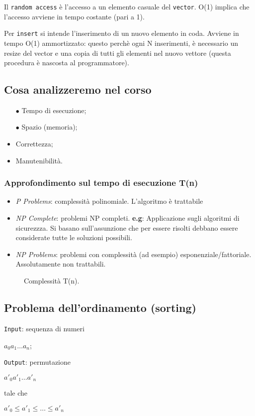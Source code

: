 Il \texttt{random access} è l'accesso a un elemento casuale del \texttt{vector}. 
O(1) implica che l'accesso avviene in tempo costante (pari a 1). \par
Per \texttt{insert} si intende l'inserimento di un nuovo elemento in coda. 
Avviene in tempo O(1) ammortizzato: questo perchè ogni N inserimenti, è 
necessario un resize del vector e una copia di tutti gli elementi nel nuovo vettore
(questa procedura è nascosta al programmatore).

\subsection{Cosa analizzeremo nel corso}

\begin{itemize}
	\item[$\bullet$] Tempo di esecuzione;
	\item[$\bullet$] Spazio (memoria);
	\medskip
	\item Correttezza;
	\item Manutenibilità.
\end{itemize}

\subsubsection{Approfondimento sul tempo di esecuzione T(n)}

\begin{itemize}
	\item \textit{P Problems}: complessità polinomiale. L'algoritmo è trattabile
	\item \textit{NP Complete}: problemi NP completi. \textbf{e.g}: Applicazione sugli algoritmi di sicurezzza. Si basano sull'assunzione che per essere risolti debbano essere considerate tutte le soluzioni possibili.
	\item \textit{NP Problems}: problemi con complessità  (ad esempio) esponenziale/fattoriale. Assolutamente non trattabili.
\end{itemize}

\begin{figure}[htb]
	\centering
	\caption{Complessità T(n).}	
\end{figure}
	
\subsection{Problema dell'ordinamento (sorting)}
\texttt{Input}: sequenza di numeri 
\begin{center}
	$a_0 a_1 \dots a_n$;\par
\end{center}
\texttt{Output}: permutazione
\begin{center}
	$a'_0 a'_1 \dots a'_n$
\end{center}
tale che 
\begin{center}
	$a'_0 \leq a'_1 \leq \dots \leq a'_n$
\end{center}

